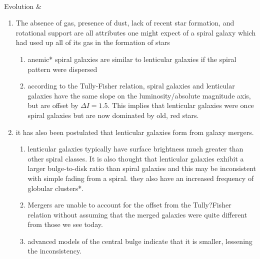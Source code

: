 \begin{longtabu}
	\\
	\hline
	Evolution & 
	\begin{enumerate}
		\item The absence of gas, presence of dust, lack of recent star formation, and rotational support are all attributes one might expect of a spiral galaxy which had used up all of its gas in the formation of stars
			\begin{enumerate}
				\item anemic* spiral galaxies are similar to lenticular galaxies if the spiral pattern were dispersed
				\item according to the Tully-Fisher relation, spiral galaxies and lenticular galaxies have the same slope on the luminosity/absolute magnitude axis, but are offset by $\Delta I = 1.5$. This implies that lenticular galaxies were once spiral galaxies but are now dominated by old, red stars.
			\end{enumerate}
		\item it has also been postulated that lenticular galaxies form from galaxy mergers.
			\begin{enumerate}
				\item  lenticular galaxies typically have surface brightness much greater than other spiral classes. It is also thought that lenticular galaxies exhibit a larger bulge-to-disk ratio than spiral galaxies and this may be inconsistent with simple fading from a spiral. they also have an increased frequency of globular clusters*.
				\item Mergers are unable to account for the offset from the Tully?Fisher relation without assuming that the merged galaxies were quite different from those we see today.
				\item advanced models of the central bulge indicate that it is smaller, lessening the inconsistency.
			\end{enumerate}
	\end{enumerate}
	\\
	\hline
\end{longtabu}
	
	